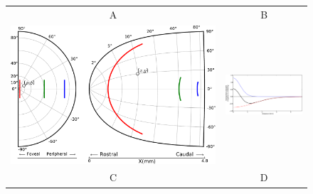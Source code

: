 \begin{figure}
\begin{tabular}{|c|c|}
\hline
A&B\\

\includegraphics[width=.5\textwidth]{figures/ch3_4_mapping} & \includegraphics[width=.5\textwidth,height=5cm]{figures/ch3_4_weights-profile}\\
\hline
C&D\\


\end{tabular}
\end{figure}
